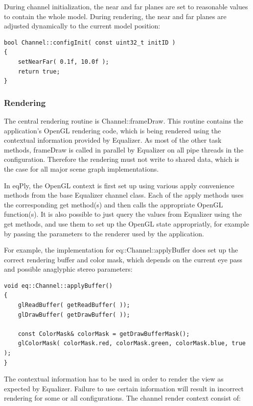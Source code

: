 \documentclass[10pt,a4]{scrartcl}
\begin{document}
During channel initialization, the near and far planes are set to
reasonable values to contain the whole model. During rendering, the near
and far planes are adjusted dynamically to the current model position:

{\footnotesize\begin{lstlisting}
bool Channel::configInit( const uint32_t initID )
{
    setNearFar( 0.1f, 10.0f );
    return true;
}
\end{lstlisting}}

\subsubsection{Rendering}

The central rendering routine is \textsf{Channel::frameDraw}. This
routine contains the application's OpenGL rendering code, which is being
rendered using the contextual information provided by Equalizer. As most
of the other task methods, \textsf{frameDraw} is called in parallel by
Equalizer on all pipe threads in the configuration. Therefore the
rendering must not write to shared data, which is the case for all major
scene graph implementations.

In \textsf{eqPly}, the OpenGL context is first set up using various
\textsf{apply} convenience methods from the base Equalizer channel
class. Each of the \textsf{apply} methods uses the corresponding
\textsf{get} method(s) and then calls the appropriate OpenGL
function(s). It is also possible to just query the values from Equalizer
using the \textsf{get} methods, and use them to set up the OpenGL state
appropriatly, for example by passing the parameters to the renderer used
by the application.

For example, the implementation for \textsf{eq::Channel::applyBuffer}
does set up the correct rendering buffer and color mask, which depends
on the current eye pass and possible anaglyphic stereo parameters:

{\footnotesize\begin{lstlisting}
void eq::Channel::applyBuffer()
{
    glReadBuffer( getReadBuffer( ));
    glDrawBuffer( getDrawBuffer( ));
    
    const ColorMask& colorMask = getDrawBufferMask();
    glColorMask( colorMask.red, colorMask.green, colorMask.blue, true );
}
\end{lstlisting}}

The contextual information has to be used in order to render the view as
expected by Equalizer. Failure to use certain information will result in
incorrect rendering for some or all configurations. The channel render
context consist of:
\end{document}
